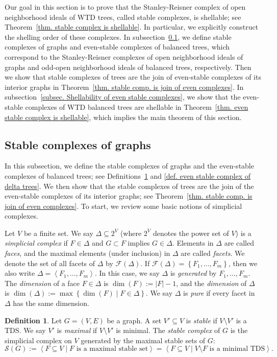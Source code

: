 \documentclass[12pt, reqno]{amsart}
\theoremstyle{definition}
\theoremstyle{plain}
\theoremstyle{definition}
\newtheorem{definition}[theorem]{Definition}
\newcommand\gen[1]{\left\langle #1 \right\rangle}
\newcommand\Set[2]{\left\lbrace #1 \mid #2 \right\rbrace}
\newcommand\set[1]{\left\lbrace #1 \right\rbrace}
\newcommand{\calS}{\mathcal{S}}
\newcommand{\calF}{\mathcal{F}}
\begin{document}
Our goal in this section is to prove that the Stanley-Reisner complex \cite{Stanley_CCA} of open neighborhood ideals of WTD trees, called stable complexes, is shellable; see Theorem~\ref{thm. stable complex is shellable}.
In particular, we explicitly construct the shelling order of these complexes.
In subsection~\ref{subsec. stable complexes}, we define stable complexes of graphs and even-stable complexes of balanced trees, which correspond to the Stanley-Reisner complexes of open neighborhood ideals of graphs and odd-open neighborhood ideals of balanced trees, respectively.
Then we show that stable complexes of trees are the join of even-stable complexes of its interior graphs in Theorem~\ref{thm. stable comp. is join of even complexes}.
In subsection~\ref{subsec. Shellability of even stable complexes}, we show that the even-stable complexes of WTD balanced trees are shellable in Theorem~\ref{thm. even stable complex is shellable}, which implies the main theorem of this section.


\subsection{Stable complexes of graphs}\label{subsec. stable complexes}
In this subsection, we define the stable complexes of graphs and the even-stable complexes of balanced trees; see Definitions~\ref{def. stable complex} and \ref{def. even stable complex of delta trees}. 
We then show that the stable complexes of trees are the join of the even-stable complexes of its interior graphs; see Theorem~\ref{thm. stable comp. is join of even complexes}.
To start, we review some basic notions of simplicial complexes.

Let $V$ be a finite set. 
We say $\Delta \subseteq 2^V$ (where $2^V$ denotes the power set of $V$) is a \emph{simplicial complex} if $F \in \Delta$ and $G \subset F$ implies $G \in \Delta$.
Elements in $\Delta$ are called \emph{faces}, and the maximal elements (under inclusion) in $\Delta$ are called \emph{facets}.
We denote the set of all facets of $\Delta$ by $\mathcal{F}(\Delta)$.
If $\calF(\Delta) = \set{ F_1,\dots,F_m}$, then we also write $\Delta = \gen{F_1,\dots,F_m}$.
In this case, we say $\Delta$ is \emph{generated} by $F_1,\dots,F_m$.
The \emph{dimension} of a face $F \in \Delta$ is $\dim(F) := |F| - 1$, and the \emph{dimension} of $\Delta$ is $\dim(\Delta) := \max\Set{\dim(F)}{F \in \Delta}$.
We say $\Delta$ is \emph{pure} if every facet in $\Delta$ has the same dimension.

\begin{definition}\label{def. stable complex}
    Let $G = (V,E)$ be a graph.
    A set $V' \subseteq V$ is \emph{stable} if $V\setminus V'$ is a TDS.
    We say $V'$ is \emph{maximal} if $V\setminus V'$ is minimal.
    The \emph{stable complex} of $G$ is the simplicial complex on $V$ generated by the maximal stable sets of $G$:
    $$
    \calS(G) := \gen{F \subseteq V\mid F \text{ is a maximal stable set}} = \gen{F \subseteq V\mid V\setminus F \text{ is a minimal TDS}}.
    $$
\end{definition}
\end{document}
